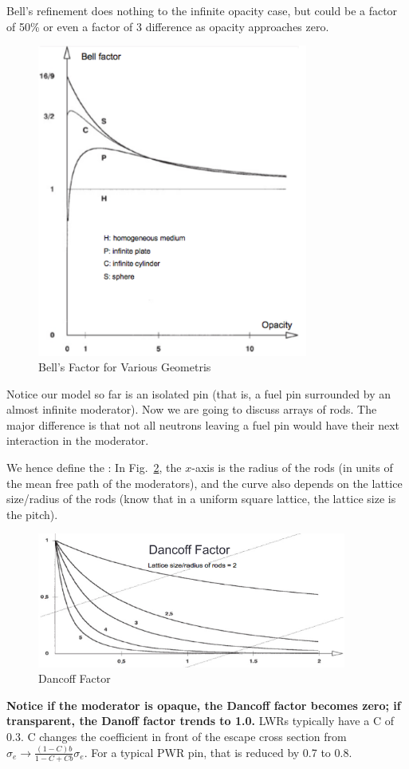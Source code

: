 \documentclass{school-22.211-notes}
\begin{document}
Bell's refinement does nothing to the infinite opacity case, but could be a factor of 50\% or even a factor of 3 difference as opacity approaches zero. 
\begin{figure}[ht]
  \centering
  \includegraphics[width=3.5in]{images/r-m/bell.png}
  \caption{Bell's Factor for Various Geometris} \label{bell}
\end{figure}

\clearpage
{}
Notice our model so far is an isolated pin (that is, a fuel pin surrounded by an almost infinite moderator). Now we are going to discuss arrays of rods. The major difference is that not all neutrons leaving a fuel pin would have their next interaction in the moderator. 

We hence define the :
In Fig.~\ref{dancoff}, the $x$-axis is the radius of the rods (in units of the mean free path of the moderators), and the curve also depends on the lattice size/radius of the rods (know that in a uniform square lattice, the lattice size is the pitch).  
\begin{figure}[ht]
  \centering
  \includegraphics[width=4in]{images/r-m/dancoff.png}
  \caption{Dancoff Factor} \label{dancoff}
\end{figure}
\textbf{Notice if the moderator is opaque, the Dancoff factor becomes zero; if transparent, the Danoff factor trends to 1.0.}  LWRs typically have a C of 0.3. 
C changes the coefficient in front of the escape cross section from $\sigma_e \to \frac{(1-C)b}{1-C + Cb} \sigma_e$. For a typical PWR pin, that is reduced by 0.7 to 0.8.
\end{document}
